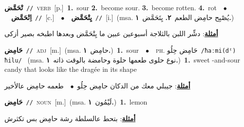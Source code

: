 \documentclass[10pt,a4paper,twoside]{article} %
\begin{document}
\begin{multicols}{2}
{\setlength\topsep{0pt}\textbf{\foreignlanguage{arabic}{تْحَمَّض}}\ {\color{gray}\texttt{//}\color{black}}\ \textsc{verb}\ [p.]\ \textbf{1.}~sour  \textbf{2.}~become sour.  \textbf{3.}~become rotten.  \textbf{4.}~rot\ \ $\bullet$\ \ \setlength\topsep{0pt}\textbf{\foreignlanguage{arabic}{اِتْحَمَّض}}\ {\color{gray}\texttt{//}\color{black}}\ [c.]\ \ $\bullet$\ \ \setlength\topsep{0pt}\textbf{\foreignlanguage{arabic}{يِتْحَمَّض}}\ {\color{gray}\texttt{//}\color{black}}\ [i.]\ \color{gray}(msa. \foreignlanguage{arabic}{يُصْبِح حامِض الطعم}~\foreignlanguage{arabic}{\textbf{٢.}}  \foreignlanguage{arabic}{يِتَحَمَّض}~\foreignlanguage{arabic}{\textbf{١.}})\color{black}\  \begin{flushright}\color{gray}\foreignlanguage{arabic}{\textbf{\underline{\foreignlanguage{arabic}{أمثلة}}}: دشِّر اللبن بالثلاجة أسبوعين عبين ما يِتْحَمَّض وبعدها اطبخه بصير أزكى}\end{flushright}\color{black}} \vspace{2mm}

{\setlength\topsep{0pt}\textbf{\foreignlanguage{arabic}{حَامِض}}\ {\color{gray}\texttt{//}\color{black}}\ \textsc{adj}\ [m.]\ \color{gray}(msa. \foreignlanguage{arabic}{حامِض}~\foreignlanguage{arabic}{\textbf{١.}})\color{black}\ \textbf{1.}~sour\ \ $\bullet$\ \ \textsc{ph.} \color{gray} \foreignlanguage{arabic}{حَامِض حِلُو}\color{black}\ {\color{gray}\texttt{/{\sffamily ħaːmi(dˤ) ħilu}/}\color{black}}\ \color{gray} (msa. \foreignlanguage{arabic}{نوع حلوى طعمها حلوة وحامضة بالوقت ذاته}~\foreignlanguage{arabic}{\textbf{١.}})\color{black}\ \textbf{1.}~sweet -and-sour candy that looks like the dragée in its shape\  \begin{flushright}\color{gray}\foreignlanguage{arabic}{\textbf{\underline{\foreignlanguage{arabic}{أمثلة}}}: جيبلي معك من الدكان حامِض حِلُو\ $\bullet$\ \  طعمه حامِض عالأخير}\end{flushright}\color{black}} \vspace{2mm}

{\setlength\topsep{0pt}\textbf{\foreignlanguage{arabic}{حَامِض}}\ {\color{gray}\texttt{//}\color{black}}\ \textsc{noun}\ [m.]\ \color{gray}(msa. \foreignlanguage{arabic}{لَيْمُون}~\foreignlanguage{arabic}{\textbf{١.}})\color{black}\ \textbf{1.}~lemon\  \begin{flushright}\color{gray}\foreignlanguage{arabic}{\textbf{\underline{\foreignlanguage{arabic}{أمثلة}}}: بتحط عالسلطة رشة حامِض بس تكثرش}\end{flushright}\color{black}} \vspace{2mm}


\end{multicols}
\end{document}
